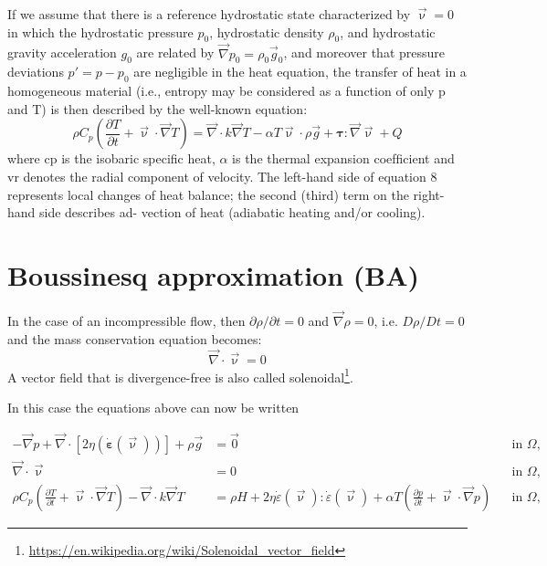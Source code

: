 \documentclass[a4paper]{article}
\begin{document}
If we assume that there is a reference hydrostatic state characterized 
by $\vec\upnu = 0$ in which the hydrostatic pressure $p_0$, 
hydrostatic density $\rho_0$, and hydrostatic gravity acceleration $g_0$ are
related by $\vec\nabla p_0 = \rho_0 \vec{g}_0$,
and moreover that pressure deviations $p'=p-p_0$
are negligible in the heat equation, the transfer of heat in a homogeneous
material (i.e., entropy may be considered as a function of only
p and T) is then described by the well-known equation:
\[
\rho C_p \left( \frac{\partial T}{\partial t} + \vec \upnu\cdot\vec\nabla T\right)
=  \vec\nabla\cdot k\vec\nabla T  
- \alpha T  \vec\upnu \cdot \rho \vec{g} 
+ {\bm \tau} : \vec\nabla \vec\upnu + Q
\]
where cp is the isobaric speciﬁc heat, $\alpha$ is the thermal expansion
coefﬁcient and vr denotes the radial component of velocity. The
left-hand side of equation 8 represents local changes of heat balance; 
the second (third) term on the right-hand side describes ad-
vection of heat (adiabatic heating and/or cooling).



\newpage
\section{Boussinesq approximation (BA)}

In the case of an incompressible flow, then $\partial \rho/\partial t=0$ and
${\vec \nabla}\rho=0$, i.e. $D\rho/Dt=0$ and the mass conservation equation becomes:
\[
{\vec \nabla}\cdot{\vec \upnu} = 0
\]
A vector field that is divergence-free is also called
solenoidal\footnote{\url{https://en.wikipedia.org/wiki/Solenoidal_vector_field}}.

In this case the equations above can now be written

\begin{align}
  - \vec\nabla p +  
  \vec\nabla \cdot \left[2\eta \left(\dot{\bm \varepsilon}(\vec \upnu)  \right)
                \right] +  \rho \vec g &= \vec{0}
  &
  & \textrm{in $\Omega$},
  \\
  \vec\nabla \cdot \vec \upnu &= 0
  &
  & \textrm{in $\Omega$},
  \\
  \rho C_p \left(\frac{\partial T}{\partial t} + \vec \upnu\cdot\vec\nabla T\right)
  - \vec\nabla\cdot k\vec\nabla T
  &=
  \rho H
  +
  2\eta \dot\varepsilon(\vec\upnu) : \dot\varepsilon(\vec\upnu) 
  +\alpha T \left( \frac{\partial p}{\partial t} +  \vec \upnu \cdot \vec\nabla p \right)
  && \textrm{in $\Omega$},
\end{align}
\end{document}

